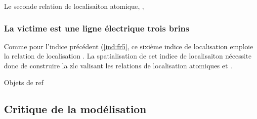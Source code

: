 Le seconde relation de localisaiton atomique, ,


\subsubsection{La victime est \protect{} une ligne
  électrique trois brins}

Comme pour l'indice précédent (\ref{ind:fr5}, ce sixième indice de
localisation emploie la relation de localisation
.
%
La spatialisation de cet indice de localisaiton nécessite donc de
construire la \ac{zlc} valisant les relations de localisation
atomiques  et .

Objets de ref

\subsection{Critique de la modélisation}
\label{subsec:9-4-3}


